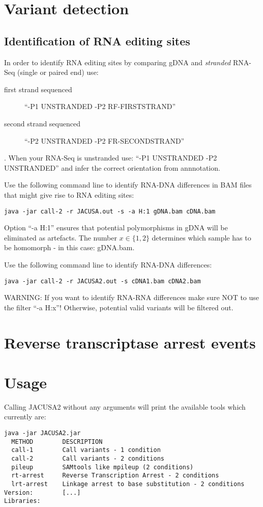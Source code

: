 \documentclass[10pt,a4paper,draft]{article}
\begin{document}
\section{Variant detection}
\subsection{Identification of RNA editing sites}
In order to identify RNA editing sites by comparing gDNA and \emph{stranded} RNA-Seq (single or paired end) use:
\begin{description} 
\item[first strand sequenced] ``-P1 UNSTRANDED -P2 RF-FIRSTSTRAND''
\item[second strand sequenced] ``-P2 UNSTRANDED -P2 FR-SECONDSTRAND''
\end{description}.
When your RNA-Seq is unstranded use: ``-P1 UNSTRANDED -P2 UNSTRANDED'' and infer the correct orientation from annnotation.

Use the following command line to identify RNA-DNA differences in BAM files that might give rise to RNA editing sites:
\begin{verbatim}
java -jar call-2 -r JACUSA.out -s -a H:1 gDNA.bam cDNA.bam
\end{verbatim}
Option ``-a H:1'' ensures that potential polymorphisms in gDNA will be eliminated as artefacts. The number $x \in \{1, 2\}$
determines which sample has to be homomorph - in this case: gDNA.bam.

Use the following command line to identify RNA-DNA differences:
\begin{verbatim}
java -jar call-2 -r JACUSA2.out -s cDNA1.bam cDNA2.bam
\end{verbatim}
WARNING: If you want to identify RNA-RNA differences make sure NOT to use the filter ``-a H:x''! Otherwise, potential valid variants will be filtered out. 
\section{Reverse transcriptase arrest events}
\section{Usage}
Calling JACUSA2 without any arguments will print the available tools which currently are:
\begin{verbatim}
java -jar JACUSA2.jar
  METHOD        DESCRIPTION
  call-1        Call variants - 1 condition
  call-2        Call variants - 2 conditions
  pileup        SAMtools like mpileup (2 conditions)
  rt-arrest     Reverse Transcription Arrest - 2 conditions
  lrt-arrest    Linkage arrest to base substitution - 2 conditions
Version: 		[...]
Libraries: 	
\end{verbatim}
\end{document}
